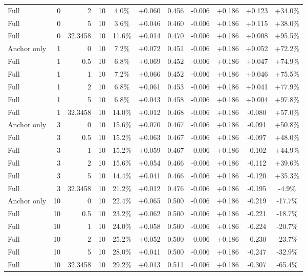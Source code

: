 \begin{table}[htbp]
\begin{tabular}{lrrrccccccc}
Full & 0 & 2 & 10 & 4.0\% & +0.060 & 0.456 & -0.006 & +0.186 & +0.123 & +34.0\% \\
Full & 0 & 5 & 10 & 3.6\% & +0.046 & 0.460 & -0.006 & +0.186 & +0.115 & +38.0\% \\
Full & 0 & 32.3458 & 10 & 11.6\% & +0.014 & 0.470 & -0.006 & +0.186 & +0.008 & +95.5\% \\
Anchor only & 1 & 0 & 10 & 7.2\% & +0.072 & 0.451 & -0.006 & +0.186 & +0.052 & +72.2\% \\
Full & 1 & 0.5 & 10 & 6.8\% & +0.069 & 0.452 & -0.006 & +0.186 & +0.047 & +74.9\% \\
Full & 1 & 1 & 10 & 7.2\% & +0.066 & 0.452 & -0.006 & +0.186 & +0.046 & +75.5\% \\
Full & 1 & 2 & 10 & 6.8\% & +0.061 & 0.453 & -0.006 & +0.186 & +0.041 & +77.9\% \\
Full & 1 & 5 & 10 & 6.8\% & +0.043 & 0.458 & -0.006 & +0.186 & +0.004 & +97.8\% \\
Full & 1 & 32.3458 & 10 & 14.0\% & +0.012 & 0.468 & -0.006 & +0.186 & -0.080 & +57.0\% \\
Anchor only & 3 & 0 & 10 & 15.6\% & +0.070 & 0.467 & -0.006 & +0.186 & -0.091 & +50.8\% \\
Full & 3 & 0.5 & 10 & 15.2\% & +0.063 & 0.467 & -0.006 & +0.186 & -0.097 & +48.0\% \\
Full & 3 & 1 & 10 & 15.2\% & +0.059 & 0.467 & -0.006 & +0.186 & -0.102 & +44.9\% \\
Full & 3 & 2 & 10 & 15.6\% & +0.054 & 0.466 & -0.006 & +0.186 & -0.112 & +39.6\% \\
Full & 3 & 5 & 10 & 14.4\% & +0.041 & 0.466 & -0.006 & +0.186 & -0.120 & +35.3\% \\
Full & 3 & 32.3458 & 10 & 21.2\% & +0.012 & 0.476 & -0.006 & +0.186 & -0.195 & -4.9\% \\
Anchor only & 10 & 0 & 10 & 22.4\% & +0.065 & 0.500 & -0.006 & +0.186 & -0.219 & -17.7\% \\
Full & 10 & 0.5 & 10 & 23.2\% & +0.062 & 0.500 & -0.006 & +0.186 & -0.221 & -18.7\% \\
Full & 10 & 1 & 10 & 24.0\% & +0.058 & 0.500 & -0.006 & +0.186 & -0.224 & -20.7\% \\
Full & 10 & 2 & 10 & 25.2\% & +0.052 & 0.500 & -0.006 & +0.186 & -0.230 & -23.7\% \\
Full & 10 & 5 & 10 & 28.0\% & +0.041 & 0.500 & -0.006 & +0.186 & -0.247 & -32.9\% \\
Full & 10 & 32.3458 & 10 & 29.2\% & +0.013 & 0.511 & -0.006 & +0.186 & -0.307 & -65.4\% \\

\end{tabular}
\end{table}
